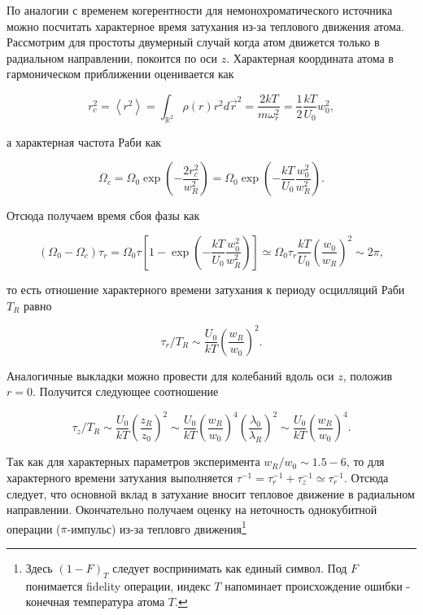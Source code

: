 По аналогии с временем когерентности для немонохроматического источника можно посчитать характерное время затухания из-за теплового движения атома. Рассмотрим для простоты двумерный случай когда атом движется только в радиальном направлении, покоится по оси $z$. Характерная координата атома в гармоническом приближении оценивается как

\begin{equation}
	r_c^2=\left< r^2\right> = \int_{\mathbb{R}^2} \rho(r)r^2 d\vec{r}^2 = \frac{2kT}{m\omega_r^2} = \frac{1}{2}\frac{kT}{U_0}w_0^2,
\end{equation}

а характерная частота Раби как

\begin{equation}
	\Omega_{c} = \Omega_0 \exp\left(-\frac{2r^2_c}{w_R^2}\right)=\Omega_0 \exp\left(-\frac{kT}{U_0}\frac{w_0^2}{w_R^2}\right).
\end{equation}

Отсюда получаем время сбоя фазы как 

\begin{equation}
	(\Omega_0 - \Omega_c)\tau_{r} = \Omega_0 \tau\left[1 - \exp\left(-\frac{kT}{U_0}\frac{w_0^2}{w_R^2}\right)\right] \simeq \Omega_0 \tau_r \frac{kT}{U_0}\left(\frac{w_0}{w_R}\right)^2 \sim 2\pi,
\end{equation}

то есть отношение характерного времени затухания к периоду осцилляций Раби $T_{R}$ равно

\begin{equation}
	\tau_{r}/T_{R} \sim \frac{U_0}{kT}\left(\frac{w_R}{w_0}\right)^2.
\end{equation}

Аналогичные выкладки можно провести для колебаний вдоль оси $z$, положив $r=0$. Получится следующее соотношение

\begin{equation}
	\tau_{z}/T_{R} \sim \frac{U_0}{kT}\left(\frac{z_{R}}{z_{0}}\right)^2 \sim \frac{U_0}{kT}\left(\frac{w_{R}}{w_{0}}\right)^4 \left(\frac{\lambda_{0}}{\lambda_{R}}\right)^2 \sim \frac{U_0}{kT}\left(\frac{w_{R}}{w_{0}}\right)^4.
\end{equation}

Так как для характерных параметров эксперимента $w_{R}/w_{0} \sim 1.5-6$, то для характерного времени затухания выполняется $\tau^{-1} = \tau_{r}^{-1} + \tau_{z}^{-1} \simeq \tau_{r}^{-1}$. Отсюда следует, что основной вклад в затухание вносит тепловое движение в радиальном направлении. Окончательно получаем оценку на неточность однокубитной операции ($\pi$-импульс) из-за тепловго движения\footnote{Здесь $(1-F)_{T}$ следует воспринимать как единый символ. Под $F$ понимается fidelity операции, индекс $T$ напоминает происхождение ошибки - конечная температура атома $T$.}

